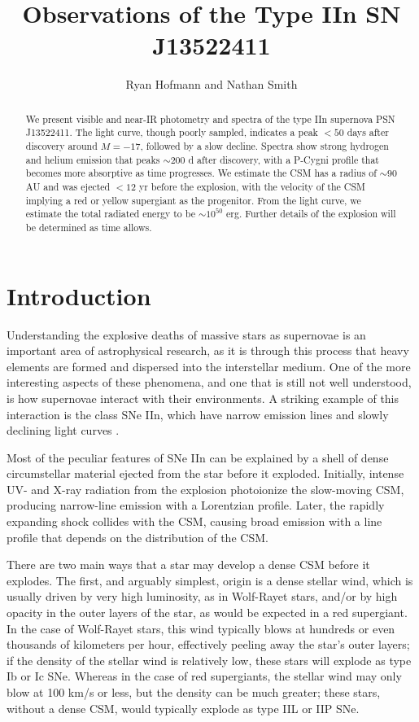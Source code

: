 \documentclass[iop]{emulateapj}
\begin{document}
\title{Observations of the Type IIn SN J13522411}

\author{Ryan Hofmann and Nathan Smith}

\begin{abstract}
We present visible and near-IR photometry and spectra of the type IIn supernova PSN J13522411. The light curve, though poorly sampled, indicates a peak $<50$ days after discovery around $M = -17$, followed by a slow decline. Spectra show strong hydrogen and helium emission that peaks $\sim200$ d after discovery, with a P-Cygni profile that becomes more absorptive as time progresses. We estimate the CSM has a radius of $\sim90$ AU and was ejected $<12$ yr before the explosion, with the velocity of the CSM implying a red or yellow supergiant as the progenitor. From the light curve, we estimate the total radiated energy to be $\sim10^{50}$ erg. Further details of the explosion will be determined as time allows.
\end{abstract}

\section{Introduction} \label{intro}
Understanding the explosive deaths of massive stars as supernovae is an important area of astrophysical research, as it is through this process that heavy elements are formed and dispersed into the interstellar medium. One of the more interesting aspects of these phenomena, and one that is still not well understood, is how supernovae interact with their environments. A striking example of this interaction is the class SNe IIn, which have narrow emission lines and slowly declining light curves \citep{Fil97}.

Most of the peculiar features of SNe IIn can be explained by a shell of dense circumstellar material ejected from the star before it exploded. Initially, intense UV- and X-ray radiation from the explosion photoionize the slow-moving CSM, producing narrow-line emission with a Lorentzian profile. Later, the rapidly expanding shock collides with the CSM, causing broad emission with a line profile that depends on the distribution of the CSM.

There are two main ways that a star may develop a dense CSM before it explodes. The first, and arguably simplest, origin is a dense stellar wind, which is usually driven by very high luminosity, as in Wolf-Rayet stars, and/or by high opacity in the outer layers of the star, as would be expected in a red supergiant. In the case of Wolf-Rayet stars, this wind typically blows at hundreds or even thousands of kilometers per hour, effectively peeling away the star's outer layers; if the density of the stellar wind is relatively low, these stars will explode as type Ib or Ic SNe. Whereas in the case of red supergiants, the stellar wind may only blow at 100 km/s or less, but the density can be much greater; these stars, without a dense CSM, would typically explode as type IIL or IIP SNe.
\end{document}
